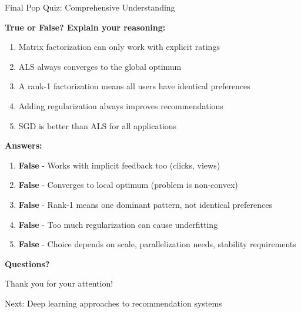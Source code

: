 \documentclass{beamer}
\begin{document}
\begin{frame}{Final Pop Quiz: Comprehensive Understanding}
\begin{tcolorbox}[colback=blue!5!white,colframe=blue!75!black,title=Mastery Test]
\textbf{True or False? Explain your reasoning:}

\pause
\begin{enumerate}[<+->]
    \item Matrix factorization can only work with explicit ratings
    \item ALS always converges to the global optimum  
    \item A rank-1 factorization means all users have identical preferences
    \item Adding regularization always improves recommendations
    \item SGD is better than ALS for all applications
\end{enumerate}

\pause
\textbf{Answers:}
\begin{enumerate}
    \item \textbf{False} - Works with implicit feedback too (clicks, views)
    \item \textbf{False} - Converges to local optimum (problem is non-convex)
    \item \textbf{False} - Rank-1 means one dominant pattern, not identical preferences
    \item \textbf{False} - Too much regularization can cause underfitting
    \item \textbf{False} - Choice depends on scale, parallelization needs, stability requirements
\end{enumerate}
\end{tcolorbox}
\end{frame}

\begin{frame}[standout]
\Huge \textbf{Questions?}
\vspace{1em}

\Large Thank you for your attention!
\vspace{1em}

\normalsize
Next: Deep learning approaches to recommendation systems
\end{frame}
\end{document}
